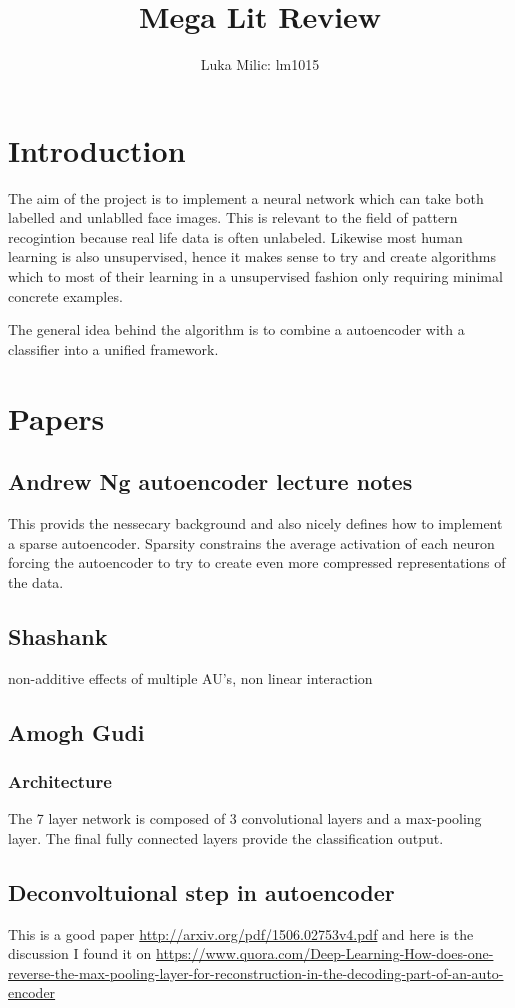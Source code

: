 \documentclass[11pt]{article}
\title{Mega Lit Review}
\author{Luka Milic: lm1015}
\begin{document}
\maketitle
\section{Introduction}
The aim of the project is to implement a neural network which can take both
labelled and unlablled face images. \cite{tensorflow2015-whitepaper}
This is relevant to the field of pattern recogintion because real life data is often unlabeled.
Likewise most human learning is also unsupervised, hence it makes sense to try and create algorithms which
to most of their learning in a unsupervised fashion only requiring minimal concrete examples.

The general idea behind the algorithm is to combine a autoencoder with a classifier into a unified
framework.
\section{Papers}
\subsection{Andrew Ng autoencoder lecture notes}
This provids the nessecary background and also nicely defines
how to implement a sparse autoencoder. Sparsity constrains the average
activation of each neuron forcing the autoencoder to try to create even more
compressed representations of the data.
\subsection{Shashank}
non-additive effects of multiple AU's, non linear interaction
\subsection{Amogh Gudi}
\subsubsection{Architecture}
The 7 layer network is composed of 3 convolutional
layers and a max-pooling layer. The final fully connected layers
provide the classification output.
\subsection{Deconvoltuional step in autoencoder}
This is a good paper \url{http://arxiv.org/pdf/1506.02753v4.pdf} and
here is the discussion I found it on \url{https://www.quora.com/Deep-Learning-How-does-one-reverse-the-max-pooling-layer-for-reconstruction-in-the-decoding-part-of-an-auto-encoder}
\end{document}
